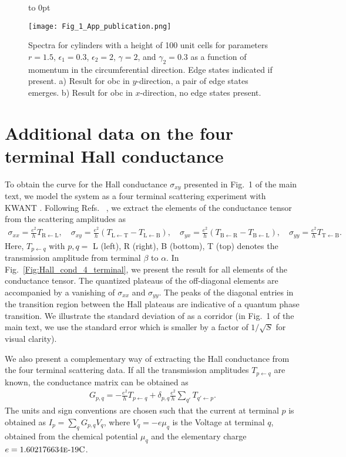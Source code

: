 \documentclass[aps,prb,amsmath,amssymb,twocolumn, superscriptaddress]{revtex4-2}
\begin{document}
\begin{figure}[htp]	 
{
    \vbox to 0pt {
            \raggedright
            \textcolor{white}{
            }
        }
}
{\texttt{[image: Fig\_1\_App\_publication.png]}}
\caption{Spectra for cylinders with a height of 100 unit cells for parameters $r = 1.5$, $\epsilon_1 = 0.3$, $\epsilon_2 = 2$, $\gamma  =2$, and $\gamma_2 = 0.3$ as a function of momentum in the circumferential direction. Edge states indicated if present. a) Result for \gls{obc} in $y$-direction, a pair of edge states emerges. b) Result for \gls{obc} in $x$-direction, no edge states present.
 }\label{Fig:Edge_states}
\end{figure}

\section{Additional data on the four terminal Hall conductance}
To obtain the curve for the Hall conductance $\sigma_{xy}$ presented in Fig.~1 of the main text, we model the system as a four terminal scattering experiment with KWANT \cite{Kwant_App, Kwant_Mumps_App}. Following Refs.~ \cite{Datta_App, 4_terminal_Hall_App}, we extract the elements of the conductance tensor from the scattering amplitudes as 
\begin{align}
\sigma_{xx}  = \frac{e^2}{h} T_\mathrm{R \leftarrow L}, \quad \sigma_{xy}  = \frac{e^2}{h} (T_\mathrm{L \leftarrow T} - T_\mathrm{L \leftarrow B}), \quad \sigma_{yx}  = \frac{e^2}{h} (T_\mathrm{B \leftarrow R} - T_\mathrm{B \leftarrow L}), \quad \sigma_{yy}  = \frac{e^2}{h} T_\mathrm{T \leftarrow B}.
\end{align}
Here, $T_{p \leftarrow q}$ with $p, q = $ L (left), R (right), B (bottom), T (top) denotes the transmission amplitude from terminal $\beta$ to $\alpha$. In Fig.~\ref{Fig:Hall_cond_4_terminal}, we present the result for all elements of the conductance tensor. The quantized plateaus of the off-diagonal elements are accompanied by a vanishing of $\sigma_{xx}$ and $\sigma_{yy}$. The peaks of the diagonal entries in the transition region between the Hall plateaus are indicative of a quantum phase transition. We illustrate the standard deviation of as a corridor (in Fig.~1 of the main text, we use the standard error which is smaller by a factor of $1 / \sqrt{S}$ for visual clarity).

We also present a complementary way of extracting the Hall conductance from the four terminal scattering data. If all the transmission amplitudes $T_{p \leftarrow q}$ are known, the conductance matrix can be obtained as 
\begin{align}
G_{p, q} =  - \frac{e^2}{h} T_{p \leftarrow q} + \delta_{p, q} \frac{e^2}{h} \sum_{q'} T_{q' \leftarrow p}.
\end{align}
The units and sign conventions are chosen such that the current at terminal $p$ is obtained as $I_p = \sum_{q} G_{p,q} V_q$, where $V_q = -e \mu_q$ is the Voltage at terminal $q$, obtained from the chemical potential $\mu_q$ and the elementary charge $e = 1.602176634 \text{\textsc{e-}}19\mathrm{C}$.  
\end{document}
